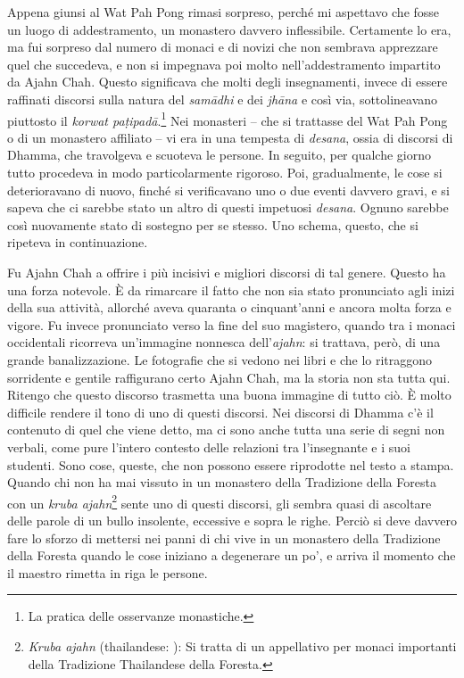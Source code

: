 Appena giunsi al Wat Pah Pong rimasi sorpreso, perché mi aspettavo che
fosse un luogo di addestramento, un monastero davvero inflessibile.
Certamente lo era, ma fui sorpreso dal numero di monaci e di novizi che
non sembrava apprezzare quel che succedeva, e non si impegnava poi molto
nell'addestramento impartito da Ajahn Chah. Questo significava che molti
degli insegnamenti, invece di essere raffinati discorsi sulla natura del
\emph{samādhi} e dei \emph{jhāna} e così via, sottolineavano piuttosto
il \emph{korwat paṭipadā}.\footnote{La pratica delle osservanze
  monastiche.} Nei monasteri -- che si trattasse del Wat Pah Pong o di
un monastero affiliato -- vi era in una tempesta di \emph{desana}, ossia
di discorsi di Dhamma, che travolgeva e scuoteva le persone. In seguito,
per qualche giorno tutto procedeva in modo particolarmente rigoroso.
Poi, gradualmente, le cose si deterioravano di nuovo, finché si
verificavano uno o due eventi davvero gravi, e si sapeva che ci sarebbe
stato un altro di questi impetuosi \emph{desana}. Ognuno sarebbe così
nuovamente stato di sostegno per se stesso. Uno schema, questo, che si
ripeteva in continuazione.

Fu Ajahn Chah a offrire i più incisivi e migliori discorsi di tal
genere. Questo ha una forza notevole. È da rimarcare il fatto che non
sia stato pronunciato agli inizi della sua attività, allorché aveva
quaranta o cinquant'anni e ancora molta forza e vigore. Fu invece
pronunciato verso la fine del suo magistero, quando tra i monaci
occidentali ricorreva un'immagine nonnesca dell'\emph{ajahn}: si
trattava, però, di una grande banalizzazione. Le fotografie che si
vedono nei libri e che lo ritraggono sorridente e gentile raffigurano
certo Ajahn Chah, ma la storia non sta tutta qui. Ritengo che questo
discorso trasmetta una buona immagine di tutto ciò. È molto difficile
rendere il tono di uno di questi discorsi. Nei discorsi di Dhamma c'è il
contenuto di quel che viene detto, ma ci sono anche tutta una serie di
segni non verbali, come pure l'intero contesto delle relazioni tra
l'insegnante e i suoi studenti. Sono cose, queste, che non possono
essere riprodotte nel testo a stampa. Quando chi non ha mai vissuto in
un monastero della Tradizione della Foresta con un \emph{kruba
ajahn}\footnote{\emph{Kruba ajahn} (thailandese: ): Si
  tratta di un appellativo per monaci importanti della Tradizione
  Thailandese della Foresta.} sente uno di questi discorsi, gli sembra
quasi di ascoltare delle parole di un bullo insolente, eccessive e sopra
le righe. Perciò si deve davvero fare lo sforzo di mettersi nei panni di
chi vive in un monastero della Tradizione della Foresta quando le cose
iniziano a degenerare un po', e arriva il momento che il maestro rimetta
in riga le persone.

